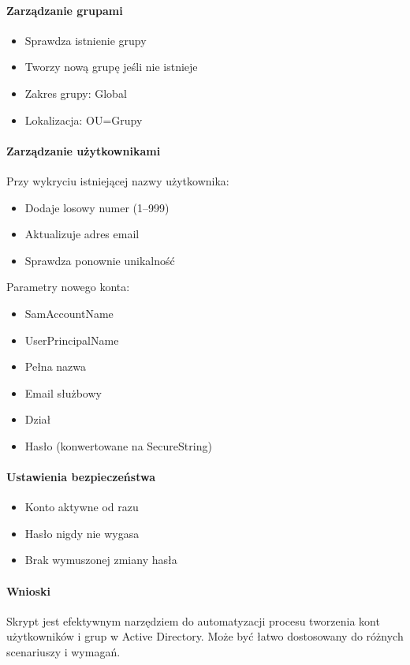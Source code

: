 \paragraph{Zarządzanie grupami}
\begin{itemize}
    \item Sprawdza istnienie grupy
    \item Tworzy nową grupę jeśli nie istnieje
    \item Zakres grupy: Global
    \item Lokalizacja: OU=Grupy
\end{itemize}

\paragraph{Zarządzanie użytkownikami}
Przy wykryciu istniejącej nazwy użytkownika:
\begin{itemize}
    \item Dodaje losowy numer (1–999)
    \item Aktualizuje adres email
    \item Sprawdza ponownie unikalność
\end{itemize}

Parametry nowego konta:
\begin{itemize}
    \item SamAccountName
    \item UserPrincipalName
    \item Pełna nazwa
    \item Email służbowy
    \item Dział
    \item Hasło (konwertowane na SecureString)
\end{itemize}

\paragraph{Ustawienia bezpieczeństwa}
\begin{itemize}
    \item Konto aktywne od razu
    \item Hasło nigdy nie wygasa
    \item Brak wymuszonej zmiany hasła
\end{itemize}


\paragraph{Wnioski}
Skrypt jest efektywnym narzędziem do automatyzacji procesu tworzenia kont użytkowników i grup w Active Directory. Może być łatwo dostosowany do różnych scenariuszy i wymagań.


